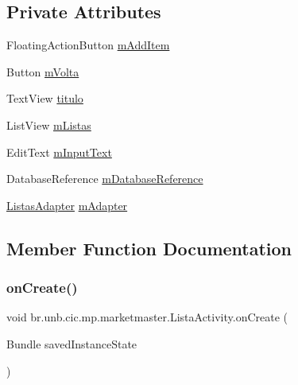 \subsection*{Private Attributes}
\begin{DoxyCompactItemize}
\item 
Floating\+Action\+Button \mbox{\hyperlink{classbr_1_1unb_1_1cic_1_1mp_1_1marketmaster_1_1ListaActivity_a1afe1b0944446dbb125a5268117e6bd9}{m\+Add\+Item}}
\item 
Button \mbox{\hyperlink{classbr_1_1unb_1_1cic_1_1mp_1_1marketmaster_1_1ListaActivity_ab3ae87c4496c8cd3c60d9748f8bd22da}{m\+Volta}}
\item 
Text\+View \mbox{\hyperlink{classbr_1_1unb_1_1cic_1_1mp_1_1marketmaster_1_1ListaActivity_a4339a82f637134424ac499df2d525303}{titulo}}
\item 
List\+View \mbox{\hyperlink{classbr_1_1unb_1_1cic_1_1mp_1_1marketmaster_1_1ListaActivity_a095a63f0453b2ef78bfc6da8288eda69}{m\+Listas}}
\item 
Edit\+Text \mbox{\hyperlink{classbr_1_1unb_1_1cic_1_1mp_1_1marketmaster_1_1ListaActivity_afdcf28158d24f037deca5c08c48ea63f}{m\+Input\+Text}}
\item 
Database\+Reference \mbox{\hyperlink{classbr_1_1unb_1_1cic_1_1mp_1_1marketmaster_1_1ListaActivity_a02a02271b85b7a5fbac2de0a00277738}{m\+Database\+Reference}}
\item 
\mbox{\hyperlink{classbr_1_1unb_1_1cic_1_1mp_1_1marketmaster_1_1ListasAdapter}{Listas\+Adapter}} \mbox{\hyperlink{classbr_1_1unb_1_1cic_1_1mp_1_1marketmaster_1_1ListaActivity_ae9968709799d2ab7b855057699ee4e46}{m\+Adapter}}
\end{DoxyCompactItemize}


\subsection{Member Function Documentation}
\mbox{\label{classbr_1_1unb_1_1cic_1_1mp_1_1marketmaster_1_1ListaActivity_aeddcd8e1aa9a40da81331e1cdef54823}} 
\subsubsection{\texorpdfstring{on\+Create()}{onCreate()}}
{\footnotesize\ttfamily void br.\+unb.\+cic.\+mp.\+marketmaster.\+Lista\+Activity.\+on\+Create (\begin{DoxyParamCaption}\item[{Bundle}]{saved\+Instance\+State }\end{DoxyParamCaption})\hspace{0.3cm}{\ttfamily [protected]}}

